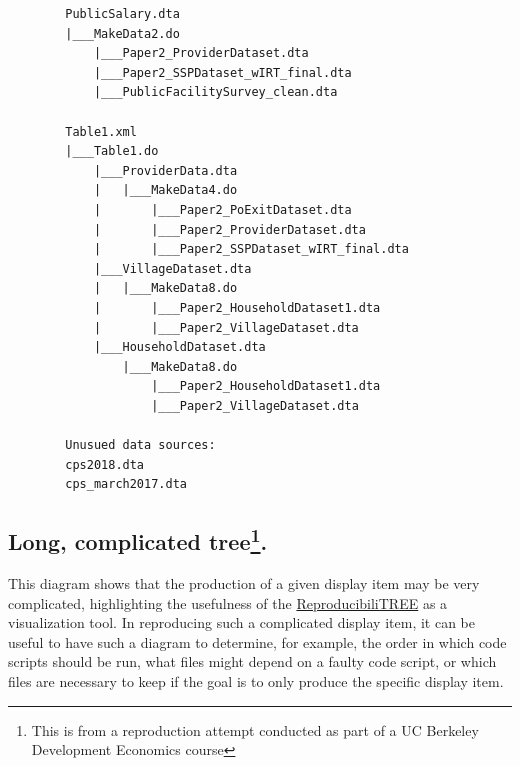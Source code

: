 \documentclass[
]{book}
\begin{document}
\begin{verbatim}
        PublicSalary.dta
        |___MakeData2.do
            |___Paper2_ProviderDataset.dta
            |___Paper2_SSPDataset_wIRT_final.dta
            |___PublicFacilitySurvey_clean.dta

        Table1.xml
        |___Table1.do
            |___ProviderData.dta
            |   |___MakeData4.do
            |       |___Paper2_PoExitDataset.dta
            |       |___Paper2_ProviderDataset.dta
            |       |___Paper2_SSPDataset_wIRT_final.dta
            |___VillageDataset.dta
            |   |___MakeData8.do
            |       |___Paper2_HouseholdDataset1.dta
            |       |___Paper2_VillageDataset.dta
            |___HouseholdDataset.dta
                |___MakeData8.do
                    |___Paper2_HouseholdDataset1.dta
                    |___Paper2_VillageDataset.dta

        Unusued data sources:
        cps2018.dta
        cps_march2017.dta  
\end{verbatim}

\hypertarget{long-complicated-tree.}{%
\subsection[Long, complicated tree.]{\texorpdfstring{Long, complicated tree\footnote{This is from a reproduction attempt conducted as part of a UC Berkeley Development Economics course}.}{Long, complicated tree.}}\label{long-complicated-tree.}}

This diagram shows that the production of a given display item may be very complicated, highlighting the usefulness of the \protect\hyperlink{diagram}{ReproducibiliTREE} as a visualization tool. In reproducing such a complicated display item, it can be useful to have such a diagram to determine, for example, the order in which code scripts should be run, what files might depend on a faulty code script, or which files are necessary to keep if the goal is to only produce the specific display item.
\end{document}
